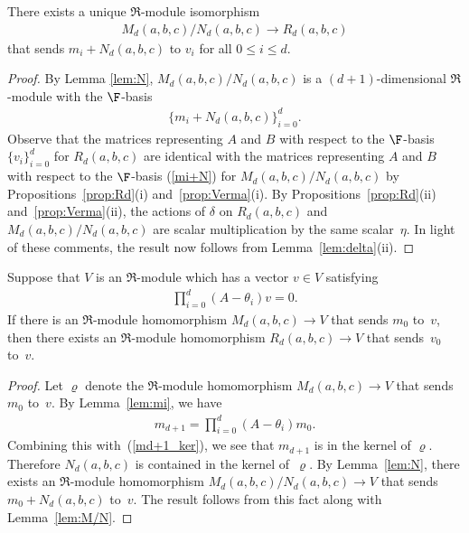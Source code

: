 \begin{Lemma}\label{lem:M/N}There exists a unique $\Re$-module isomorphism
\begin{gather*}
M_d(a,b,c)/N_d(a,b,c)\to R_d(a,b,c)
\end{gather*}
that sends $m_i+N_d(a,b,c)$ to $v_i$ for all $0\leq i\leq d$.
\end{Lemma}
\begin{proof}By Lemma \ref{lem:N}, $M_d(a,b,c)/N_d(a,b,c)$ is a $(d+1)$-dimensional $\Re$-module with the $\F$-basis
\begin{gather}\label{mi+N}
\{m_i+N_d(a,b,c)\}_{i=0}^d.
\end{gather}
Observe that the matrices representing $A$ and $B$ with respect to the $\F$-basis $\{v_i\}_{i=0}^d$ for $R_d(a,b,c)$ are identical with the matrices representing $A$ and $B$ with respect to the $\F$-basis (\ref{mi+N}) for $M_d(a,b,c)/N_d(a,b,c)$ by Propositions~\ref{prop:Rd}(i) and~\ref{prop:Verma}(i). By Propositions~\ref{prop:Rd}(ii) and~\ref{prop:Verma}(ii), the actions of $\delta$ on $R_d(a,b,c)$ and $M_d(a,b,c)/N_d(a,b,c)$ are scalar multiplication by the same scalar~$\eta$. In light of these comments, the result now follows from Lemma~\ref{lem:delta}(ii).
\end{proof}

\begin{Proposition}\label{prop:R}Suppose that $V$ is an $\Re$-module which has a vector $v\in V$ satisfying
\begin{gather}\label{md+1_ker}
\prod_{i=0}^d (A-\theta_i) v=0.
\end{gather}
If there is an $\Re$-module homomorphism $M_d(a,b,c)\to V$ that sends $m_0$ to~$v$, then there exists an $\Re$-module homomorphism $R_d(a,b,c)\to V$ that sends~$v_0$ to~$v$.
\end{Proposition}
\begin{proof}Let $\varrho$ denote the $\Re$-module homomorphism $M_d(a,b,c)\to V$ that sends~$m_0$ to~$v$. By Lemma~\ref{lem:mi}, we have
\begin{gather*}
m_{d+1}=\prod_{i=0}^d (A-\theta_i) m_0.
\end{gather*}
Combining this with~(\ref{md+1_ker}), we see that $m_{d+1}$ is in the kernel of $\varrho$. Therefore $N_d(a,b,c)$ is contained in the kernel of~$\varrho$. By Lemma~\ref{lem:N}, there exists an $\Re$-module homomorphism $M_d(a,b,c)/N_d(a,b,c)\to V$ that sends $m_0+N_d(a,b,c)$ to~$v$. The result follows from this fact along with Lemma~\ref{lem:M/N}.
\end{proof}
